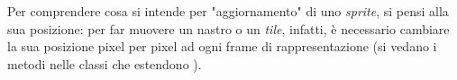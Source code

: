 Per comprendere cosa si intende per "aggiornamento" di uno \textit{sprite}, si pensi alla sua posizione: per far muovere un nastro o un \textit{tile}, infatti, è necessario cambiare la sua posizione pixel per pixel ad ogni frame di rappresentazione (si vedano i metodi  nelle classi che estendono ).

